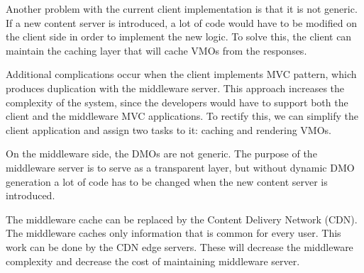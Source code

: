 Another problem with the current client implementation is that it is not generic. If a new content server is introduced, a lot of code would have to be modified on the client side in order to implement the new logic. To solve this, the client can maintain the caching layer that will cache VMOs from the responses. 

Additional complications occur when the client implements MVC pattern, which produces duplication with the middleware server. This approach increases the complexity of the system, since the developers would have to support both the client and the middleware MVC applications. To rectify this, we can simplify the client application and assign two tasks to it: caching and rendering VMOs.

On the middleware side, the DMOs are not generic. The purpose of the middleware server is to serve as a transparent layer, but without dynamic DMO generation a lot of code has to be changed when the new content server is introduced.

The middleware cache can be replaced by the Content Delivery Network (CDN). The middleware caches only information that is common for every user. This work can be done by the CDN edge servers. These will decrease the middleware complexity and decrease the cost of maintaining middleware server.


\newpage
